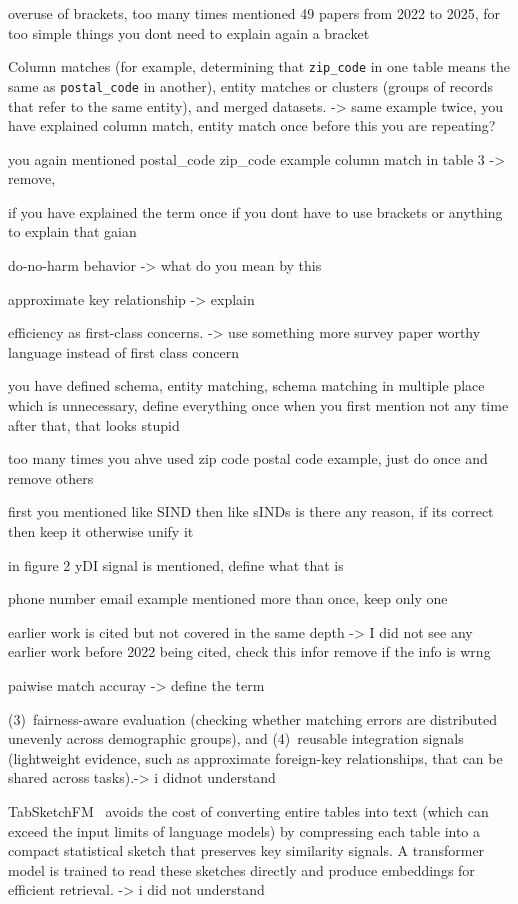 overuse of brackets, 
too many times mentioned 49 papers from 2022 to 2025, 
for too simple things you dont need to explain again a bracket

Column matches (for example, determining that \texttt{zip\_code} in one table means the same as \texttt{postal\_code} in another), entity matches or clusters (groups of records that refer to the same entity), and merged datasets. -> same example twice, you have explained column match, entity match once before this you are repeating?

you again mentioned postal_code zip_code example column match in table 3 -> remove,

if you have explained the term once if you dont have to use brackets or anything to explain that gaian

do-no-harm behavior -> what do you mean by this

approximate key relationship -> explain

efficiency as first-class concerns. -> use something more survey paper worthy language instead of first class concern

you have defined schema, entity matching, schema matching in multiple place which is unnecessary, define everything once when you first mention not any time after that, that looks stupid

too many times you ahve used zip code postal code example, just do once and remove others

first you mentioned like SIND then like sINDs is there any reason, if its correct then keep it otherwise unify it


in figure 2 yDI signal is mentioned, define what that is


phone number email example mentioned more than once, keep only one


earlier work is cited but not covered in the same depth -> I did not see any earlier work before 2022 being cited, check this infor remove if the info is wrng


paiwise match accuray -> define the term


(3)~fairness-aware evaluation (checking whether matching errors are distributed unevenly across demographic groups), and (4)~reusable integration signals (lightweight evidence, such as approximate foreign-key relationships, that can be shared across tasks).-> i didnot understand

TabSketchFM~\cite{11113110} avoids the cost of converting entire tables into text (which can exceed the input limits of language models) by compressing each table into a compact statistical sketch that preserves key similarity signals. A transformer model is trained to read these sketches directly and produce embeddings for efficient retrieval. -> i did not understand

